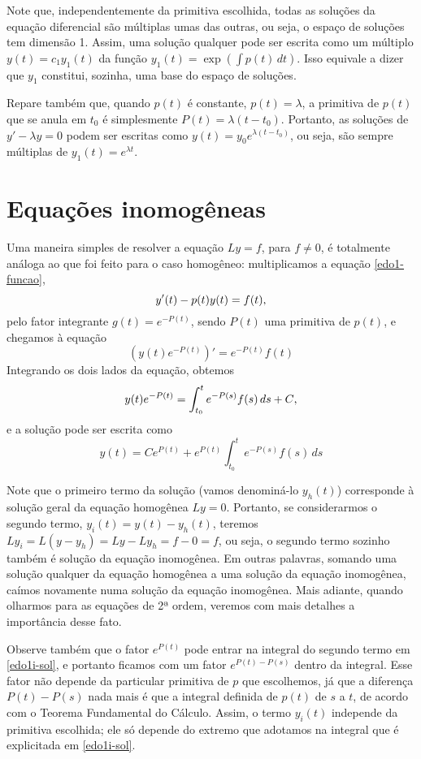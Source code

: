 \documentclass[12pt,a4paper,oneside]{memoir}
\begin{document}
Note que, independentemente da primitiva escolhida, todas as soluções da equação diferencial são múltiplas umas das outras, ou seja, o espaço de soluções tem dimensão 1.  Assim, uma solução qualquer pode ser escrita como um múltiplo $y(t) = c_1 y_1(t)$ da função $y_1(t) = \exp \left( \int p(t)\,dt \right)$.  Isso equivale a dizer que $y_1$ constitui, sozinha, uma base do espaço de soluções.

Repare também que, quando $p(t)$ é constante, $p(t) = \lambda$, a primitiva de $p(t)$ que se anula em $t_0$ é simplesmente $P(t) = \lambda(t - t_0)$.  Portanto, as soluções de $y' - \lambda y = 0$ podem ser escritas como $y(t) = y_0 e^{\lambda(t - t_0)}$, ou seja, são sempre múltiplas de $y_1(t) = e^{\lambda t}$.


\section{Equações inomogêneas}

Uma maneira simples de resolver a equação $Ly = f$, para $f \neq 0$, é totalmente análoga ao que foi feito para o caso homogêneo: multiplicamos a equação \eqref{edo1-funcao}, \[
  y'(t) - p(t) y(t) = f(t) \text, \]
pelo fator integrante $g(t) = e^{-P(t)}$, sendo $P(t)$ uma primitiva de $p(t)$, e chegamos à equação
\[
  \left( y(t) e^{-P(t)} \right)' = e^{-P(t)} f(t)
\]
Integrando os dois lados da equação, obtemos
\[
  y(t) e^{-P(t)} = \int_{t_0}^{t} e^{-P(s)} f(s)\,ds + C \text,
\]
e a solução pode ser escrita como
\begin{equation}
\label{edo1i-sol}
  y(t) = C e^{P(t)} + e^{P(t)} \int_{t_0}^{t} e^{-P(s)} f(s)\,ds
\end{equation}

Note que o primeiro termo da solução (vamos denominá-lo $y_h(t)$) corresponde à solução geral da equação homogênea $Ly = 0$.  Portanto, se considerarmos o segundo termo, $y_i(t) = y(t) - y_h(t)$, teremos $L y_i = L(y - y_h) = Ly - Ly_h = f - 0 = f$, ou seja, o segundo termo sozinho também é solução da equação inomogênea.  Em outras palavras, somando uma solução qualquer da equação homogênea a uma solução da equação inomogênea, caímos novamente numa solução da equação inomogênea.  Mais adiante, quando olharmos para as equações de 2ª ordem, veremos com mais detalhes a importância desse fato.

Observe também que o fator $e^{P(t)}$ pode entrar na integral do segundo termo em \eqref{edo1i-sol}, e portanto ficamos com um fator $e^{P(t) - P(s)}$ dentro da integral.  Esse fator não depende da particular primitiva de $p$ que escolhemos, já que a diferença $P(t) - P(s)$ nada mais é que a integral definida de $p(t)$ de $s$ a $t$, de acordo com o Teorema Fundamental do Cálculo.  Assim, o termo $y_i(t)$ independe da primitiva escolhida; ele só depende do extremo que adotamos na integral que é explicitada em \eqref{edo1i-sol}.
\end{document}
